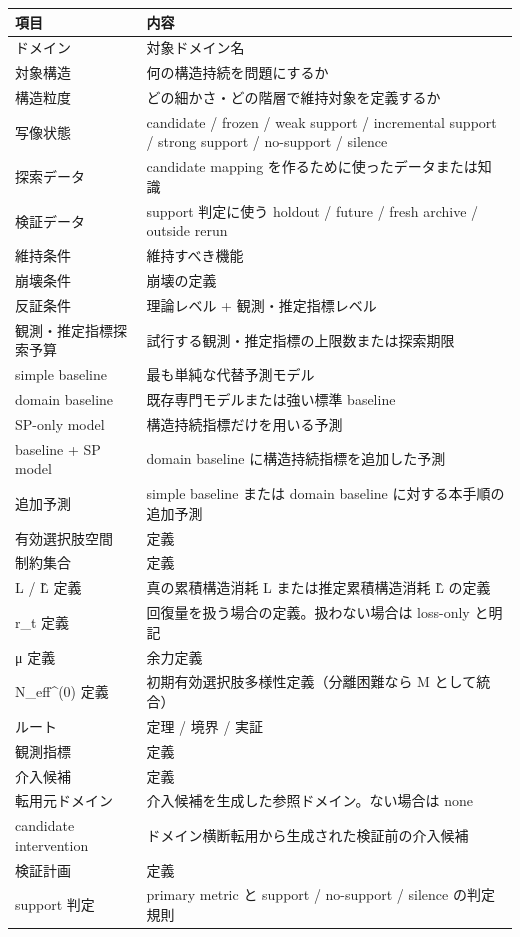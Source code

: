 \documentclass[12pt,a4paper]{article}
\begin{document}
{\def\LTcaptype{table} %
\begin{longtable}[]{@{}
  >{\raggedright\arraybackslash}p{}
  >{\raggedright\arraybackslash}p{}@{}}
\toprule\noalign{}
\begin{minipage}[b]{\linewidth}\raggedright
項目
\end{minipage} & \begin{minipage}[b]{\linewidth}\raggedright
内容
\end{minipage} \\
\midrule\noalign{}
\endhead
\bottomrule\noalign{}
\endlastfoot
ドメイン & 対象ドメイン名 \\
対象構造 & 何の構造持続を問題にするか \\
構造粒度 & どの細かさ・どの階層で維持対象を定義するか \\
写像状態 & candidate / frozen / weak support / incremental support / strong support / no-support / silence \\
探索データ & candidate mapping を作るために使ったデータまたは知識 \\
検証データ & support 判定に使う holdout / future / fresh archive / outside rerun \\
維持条件 & 維持すべき機能 \\
崩壊条件 & 崩壊の定義 \\
反証条件 & 理論レベル + 観測・推定指標レベル \\
観測・推定指標探索予算 & 試行する観測・推定指標の上限数または探索期限 \\
simple baseline & 最も単純な代替予測モデル \\
domain baseline & 既存専門モデルまたは強い標準 baseline \\
SP-only model & 構造持続指標だけを用いる予測 \\
baseline + SP model & domain baseline に構造持続指標を追加した予測 \\
追加予測 & simple baseline または domain baseline に対する本手順の追加予測 \\
有効選択肢空間 & 定義 \\
制約集合 & 定義 \\
L / L̂ 定義 & 真の累積構造消耗 L または推定累積構造消耗 L̂ の定義 \\
r\_t 定義 & 回復量を扱う場合の定義。扱わない場合は loss-only と明記 \\
μ 定義 & 余力定義 \\
N\_eff\^{}(0) 定義 & 初期有効選択肢多様性定義（分離困難なら M として統合） \\
ルート & 定理 / 境界 / 実証 \\
観測指標 & 定義 \\
介入候補 & 定義 \\
転用元ドメイン & 介入候補を生成した参照ドメイン。ない場合は none \\
candidate intervention & ドメイン横断転用から生成された検証前の介入候補 \\
検証計画 & 定義 \\
support 判定 & primary metric と support / no-support / silence の判定規則 \\
\end{longtable}
}
\end{document}
